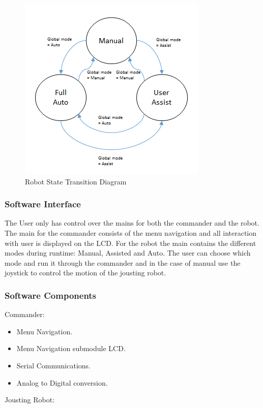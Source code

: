 \documentclass{article}
\begin{document}
	\begin{figure}[h]
		\includegraphics[scale=0.7]{robot_std.png}
		\centering
		\caption{Robot State Transition Diagram}
	\end{figure}

\subsubsection{Software Interface}
The User only has control over the mains for both the commander and the robot.
The main for the commander consists of the menu navigation and all interaction with user is displayed on the LCD. For the robot the main contains the different modes during runtime: Manual, Assisted and Auto. The user can choose which mode and run it through the commander and in the case of manual use the joystick to control the motion of the jousting robot.


\subsubsection{Software Components}

Commander:
\begin{itemize}
	\item Menu Navigation.
	\item Menu Navigation submodule LCD.
	\item Serial Communications. 
	\item Analog to Digital conversion.
\end{itemize}
	
Jousting Robot:
\end{document}
